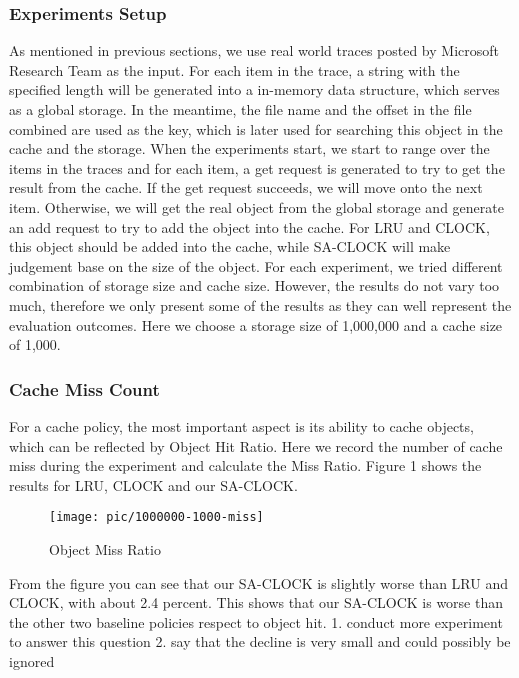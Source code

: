 \documentclass[conference]{IEEEtran}
\begin{document}
\subsubsection{Experiments Setup}
As mentioned in previous sections, we use real world traces posted by Microsoft Research Team as the input. For each item in the trace, a string with the specified length will be generated into a in-memory data structure, which serves as a global storage. In the meantime, the file name and the offset in the file combined are used as the key, which is later used for searching this object in the cache and the storage. 
When the experiments start, we start to range over the items in the traces and for each item, a get request is generated to try to get the result from the cache. If the get request succeeds, we will move onto the next item. Otherwise, we will get the real object from the global storage and generate an add request to try to add the object into the cache. For LRU and CLOCK, this object should be added into the cache, while SA-CLOCK will make judgement base on the size of the object.
For each experiment, we tried different combination of storage size and cache size. However, the results do not vary too much, therefore we only present some of the results as they can well represent the evaluation outcomes. Here we choose a storage size of 1,000,000 and a cache size of 1,000.

\subsubsection{Cache Miss Count}
For a cache policy, the most important aspect is its ability to cache objects, which can be reflected by Object Hit Ratio. Here we record the number of cache miss during the experiment and calculate the Miss Ratio. Figure 1 shows the results for LRU, CLOCK and our SA-CLOCK. 

\begin{figure}[h]
    \centering
    \texttt{[image: pic/1000000-1000-miss]}
    \caption{Object Miss Ratio}
\end{figure}

From the figure you can see that our SA-CLOCK is slightly worse than LRU and CLOCK, with about 2.4 percent. This shows that our SA-CLOCK is worse than the other two baseline policies respect to object hit.
1. conduct more experiment to answer this question
2. say that the decline is very small and could possibly be ignored
\end{document}
